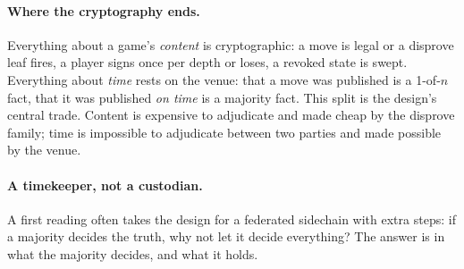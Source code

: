 \documentclass[11pt]{article}
\begin{document}
\paragraph{Where the cryptography ends.} Everything about a game's
\emph{content} is cryptographic: a move is legal or a disprove leaf
fires, a player signs once per depth or loses, a revoked state is swept.
Everything about \emph{time} rests on the venue: that a move was
published is a 1-of-$n$ fact, that it was published \emph{on time} is a
majority fact. This split is the design's central trade. Content is
expensive to adjudicate and made cheap by the disprove family; time is
impossible to adjudicate between two parties and made possible by the
venue.

\paragraph{A timekeeper, not a custodian.} A first reading often takes
the design for a federated sidechain with extra steps: if a majority
decides the truth, why not let it decide everything? The answer is in
what the majority decides, and what it holds.
\end{document}
